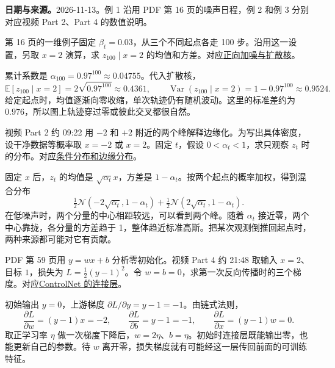 \begingroup
\renewcommand{\recordid}[1]{}
\renewcommand{\relatedtopic}[2]{\hyperref[topic:#1]{#2}}
\textbf{日期与来源。}2026-11-13。例 1 沿用 PDF 第 16 页的噪声日程，例 2 和例 3 分别对应视频 Part 2、Part 4 的数值说明。

第 16 页的一维例子固定 $\beta_t=0.03$，从三个不同起点各走 100 步。沿用这一设置，另取 $x=2$ 演算，求 $z_{100}\mid x=2$ 的均值和方差。对应\relatedtopic{SC4001-L13-T01}{正向加噪与扩散核}。
\begin{workedsolution}
累计系数是 $\alpha_{100}=0.97^{100}\approx0.04755$。代入扩散核，
\[
 \mathbb E[z_{100}\mid x=2]=2\sqrt{0.97^{100}}\approx0.4361,\qquad
 \operatorname{Var}(z_{100}\mid x=2)=1-0.97^{100}\approx0.9524 .
\]
给定起点时，均值逐渐向零收缩，单次轨迹仍有随机波动。这里的标准差约为 $0.976$，所以图上轨迹穿过零或彼此交叉都很自然。
\end{workedsolution}

视频 Part 2 约 09:22 用 $-2$ 和 $+2$ 附近的两个峰解释边缘化。为写出具体密度，设干净数据等概率取 $x=-2$ 或 $x=2$。固定 $t$，假设 $0<\alpha_t<1$，求只观察 $z_t$ 时的分布。对应\relatedtopic{SC4001-L13-T02}{条件分布和边缘分布}。
\begin{workedsolution}
固定 $x$ 后，$z_t$ 的均值是 $\sqrt{\alpha_t}x$，方差是 $1-\alpha_t$。按两个起点的概率加权，得到混合分布
\[
 \tfrac12\mathcal N(-2\sqrt{\alpha_t},1-\alpha_t)
 +\tfrac12\mathcal N(2\sqrt{\alpha_t},1-\alpha_t).
\]
在低噪声时，两个分量的中心相距较远，可以看到两个峰。随着 $\alpha_t$ 接近零，两个中心靠拢，各分量的方差趋于 1，整体趋近标准高斯。把某次观测倒推回起点时，两种来源都可能对它有贡献。
\end{workedsolution}

PDF 第 59 页用 $y=wx+b$ 分析零初始化。视频 Part 4 约 21:48 取输入 $x=2$、目标 $1$，损失为 $L=\tfrac12(y-1)^2$。令 $w=b=0$，求第一次反向传播时的三个梯度。对应\relatedtopic{SC4001-L13-T04}{ControlNet 的连接层}。
\begin{workedsolution}
初始输出 $y=0$，上游梯度 $\partial L/\partial y=y-1=-1$。由链式法则，
\[
 \frac{\partial L}{\partial w}=(y-1)x=-2,\qquad
 \frac{\partial L}{\partial b}=y-1=-1,\qquad
 \frac{\partial L}{\partial x}=(y-1)w=0.
\]
取正学习率 $\eta$ 做一次梯度下降后，$w=2\eta$、$b=\eta$。初始时连接层既能输出零，也能更新自己的参数。待 $w$ 离开零，损失梯度就有可能经这一层传回前面的可训练特征。
\end{workedsolution}
\endgroup
